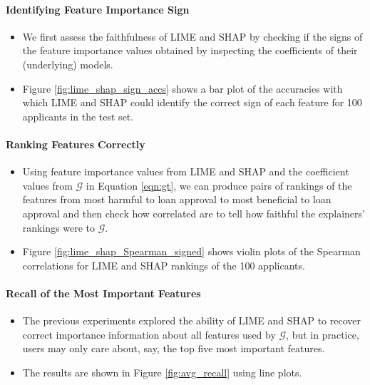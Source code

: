 \documentclass[mnsc,blindrev]{informs3}
\begin{document}
        
                    
                    
        \paragraph{\textbf{Identifying Feature Importance Sign}}
            \label{sec:sign_acc}
            \begin{itemize}
            \item We first assess the faithfulness of LIME and SHAP by checking if the signs of the feature importance values obtained by inspecting the coefficients of their (underlying) models.
                        
                        
            \item Figure \ref{fig:lime_shap_sign_accs} shows a bar plot of the accuracies with which LIME and SHAP could identify the correct sign of each feature for 100 applicants in the test set.
            \end{itemize}
                    
        \paragraph{\textbf{Ranking Features Correctly}}
            \label{sec:feature_rankings}
            \begin{itemize}
            \item Using feature importance values from LIME and SHAP and the coefficient values from $\mathcal{G}$ in Equation \ref{eqn:gt}, we can produce pairs of rankings of the features from most harmful to loan approval to most beneficial to loan approval and then check how correlated are to tell how faithful the explainers' rankings were to $\mathcal{G}$.
            
            \item Figure \ref{fig:lime_shap_Spearman_signed} shows violin plots of the Spearman correlations for LIME and SHAP rankings of the 100 applicants.
            \end{itemize}
            
        \paragraph{\textbf{Recall of the Most Important Features}}
            \label{sec:recall}
            \begin{itemize}
            \item The previous experiments explored the ability of LIME and SHAP to recover correct importance information about all features used by $\mathcal{G}$, but in practice,  users may only care about, say, the top five most important features.
            
            \item The results are shown in Figure \ref{fig:avg_recall} using line plots.
            \end{itemize}
\end{document}
